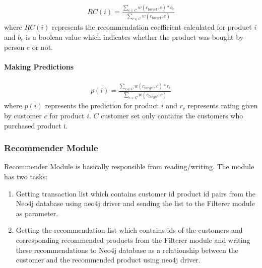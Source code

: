 	\begin{equation*} 
	\begin{split}
		RC(i) = \frac{\sum_{c \in C}^{} w(c_{target}, c)*b_{c}}{\sum_{c \in C}^{} w(c_{target}, c)}
	\end{split}
	\end{equation*}
	where $RC(i)$ represents the recommendation coefficient calculated for product $i$ and $b_{c}$ is a boolean value which indicates whether the product was bought by person c or not.

	
	\paragraph{Making Predictions}
	\begin{equation*} 
	\begin{split}
		p(i) = \frac{\sum_{c \in C}^{} w(c_{target}, c)*r_{c}}{\sum_{c \in C}^{} w(c_{target}, c)}
	\end{split}
	\end{equation*}
	where $p(i)$ represents the prediction for product $i$ and $r_{c}$ represents rating given by customer $c$ for product $i$. $C$ customer set only contains the customers who purchased product i.
	
	\subsubsection{Recommender Module} Recommender Module is basically responsible from reading/writing. The module has two tasks:
	\begin{enumerate}
		\item Getting transaction list which contains customer id product id pairs from the Neo4j database using neo4j driver and sending the list to the Filterer module as parameter.
		\item Getting the recommendation list which contains ids of the customers and corresponding recommended products from the Filterer module and writing these recommendations to Neo4j database as a relationship between the customer and the recommended product using neo4j driver.
	\end{enumerate}